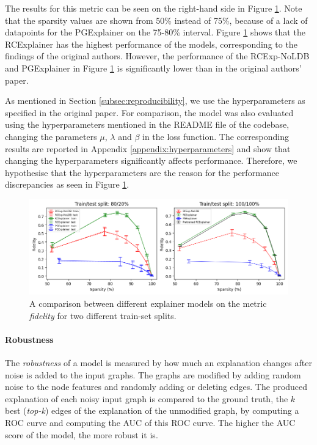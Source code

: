 The results for this metric can be seen on the right-hand side in Figure \ref{fig:fidelity}. Note that the sparsity values are shown from 50\% instead of 75\%, because of a lack of datapoints for the PGExplainer on the 75-80\% interval. Figure \ref{fig:fidelity} shows that the RCExplainer has the highest performance of the models, corresponding to the findings of the original authors. However, the performance of the RCExp-NoLDB and PGExplainer in Figure \ref{fig:fidelity} is significantly lower than in the original authors' paper.  

As mentioned in Section \ref{subsec:reproducibility}, we use the hyperparameters as specified in the original paper. For comparison, the model was also evaluated using the hyperparameters mentioned in the README file of the codebase, changing the parameters $\mu$, $\lambda$ and $\beta$ in the loss function.
The corresponding results are reported in Appendix \ref{appendix:hyperparameters} and show that changing the hyperparameters significantly affects performance. Therefore, we hypothesise that the hyperparameters are the reason for the performance discrepancies as seen in Figure \ref{fig:fidelity}.

\begin{figure}[h!]
    \centerline{\includegraphics[width=1\linewidth]{Images/fidelity_10_2.png}}
    \caption{A comparison between different explainer models on the metric \textit{fidelity} for two different train-set splits.}
    \label{fig:fidelity}
\end{figure}

\paragraph{Robustness}
The \textit{robustness} of a model is measured by how much an explanation changes after noise is added to the input graphs. The graphs are modified by adding random noise to the node features and randomly adding or deleting edges. The produced explanation of each noisy input graph is compared to the ground truth, the $k$ best (\textit{top-k}) edges of the explanation of the unmodified graph, by computing a ROC curve and computing the AUC of this ROC curve. The higher the AUC score of the model, the more robust it is. 

